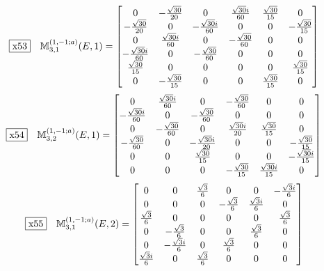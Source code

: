 \documentclass[fleqn,10pt,landscape]{jsarticle}
\begin{document}
\begin{dmath*}
\fbox{x53}\quad \mathbb{M}_{3,1}^{(1,-1;a)}(E,1)=\begin{bmatrix} 0 & - \frac{\sqrt{30}}{20} & 0 & \frac{\sqrt{30} i}{60} & \frac{\sqrt{30}}{15} & 0 \\ - \frac{\sqrt{30}}{20} & 0 & - \frac{\sqrt{30} i}{60} & 0 & 0 & - \frac{\sqrt{30}}{15} \\ 0 & \frac{\sqrt{30} i}{60} & 0 & - \frac{\sqrt{30}}{60} & 0 & 0 \\ - \frac{\sqrt{30} i}{60} & 0 & - \frac{\sqrt{30}}{60} & 0 & 0 & 0 \\ \frac{\sqrt{30}}{15} & 0 & 0 & 0 & 0 & \frac{\sqrt{30}}{15} \\ 0 & - \frac{\sqrt{30}}{15} & 0 & 0 & \frac{\sqrt{30}}{15} & 0 \end{bmatrix}
\end{dmath*}
\begin{dmath*}
\fbox{x54}\quad \mathbb{M}_{3,2}^{(1,-1;a)}(E,1)=\begin{bmatrix} 0 & \frac{\sqrt{30} i}{60} & 0 & - \frac{\sqrt{30}}{60} & 0 & 0 \\ - \frac{\sqrt{30} i}{60} & 0 & - \frac{\sqrt{30}}{60} & 0 & 0 & 0 \\ 0 & - \frac{\sqrt{30}}{60} & 0 & \frac{\sqrt{30} i}{20} & \frac{\sqrt{30}}{15} & 0 \\ - \frac{\sqrt{30}}{60} & 0 & - \frac{\sqrt{30} i}{20} & 0 & 0 & - \frac{\sqrt{30}}{15} \\ 0 & 0 & \frac{\sqrt{30}}{15} & 0 & 0 & - \frac{\sqrt{30} i}{15} \\ 0 & 0 & 0 & - \frac{\sqrt{30}}{15} & \frac{\sqrt{30} i}{15} & 0 \end{bmatrix}
\end{dmath*}
\begin{dmath*}
\fbox{x55}\quad \mathbb{M}_{3,1}^{(1,-1;a)}(E,2)=\begin{bmatrix} 0 & 0 & \frac{\sqrt{3}}{6} & 0 & 0 & - \frac{\sqrt{3} i}{6} \\ 0 & 0 & 0 & - \frac{\sqrt{3}}{6} & \frac{\sqrt{3} i}{6} & 0 \\ \frac{\sqrt{3}}{6} & 0 & 0 & 0 & 0 & \frac{\sqrt{3}}{6} \\ 0 & - \frac{\sqrt{3}}{6} & 0 & 0 & \frac{\sqrt{3}}{6} & 0 \\ 0 & - \frac{\sqrt{3} i}{6} & 0 & \frac{\sqrt{3}}{6} & 0 & 0 \\ \frac{\sqrt{3} i}{6} & 0 & \frac{\sqrt{3}}{6} & 0 & 0 & 0 \end{bmatrix}
\end{dmath*}
\end{document}
